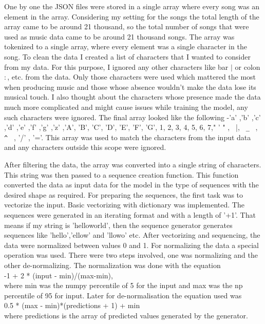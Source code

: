 \documentclass[oneside,12pt]{Classes/RoboticsLaTeX}
\begin{document}
One by one the JSON files were stored in a single array where every song was an element in the array. Considering my setting for the songs the total length of the array came to be around 21 thousand, so the total number of songs that were used as music data came to be around 21 thousand songs. The array was tokenized to a single array, where every element was a single character in the song. To clean the data I created a list of characters that I wanted to consider from my data. For this purpose, I ignored any other characters like bar $|$ or colon $:$, etc. from the data. Only those characters were used which mattered the most when producing music and those whose absence wouldn't make the data lose its musical touch. I also thought about the characters whose presence made the data much more complicated and might cause issues while training the model, any such characters were ignored. The final array looked like the following -'a' ,'b' ,'c' ,'d' ,'e' ,'f' ,'g' ,'z' ,'A', 'B', 'C', 'D', 'E', 'F', 'G', 1, 2, 3, 4, 5, 6, 7," ' " ,\verb| | |, \verb| _ | ,\verb| ^ | , '/' , '='. This array was used to match the characters from the input data and any characters outside this scope were ignored.

After filtering the data, the array was converted into a single string of characters. This string was then passed to a sequence creation function. This function converted the data as input data for the model in the type of sequences with the desired shape as required. For preparing the sequences, the first task was to vectorize the input. Basic vectorizing with dictionary was implemented. The sequences were generated in an iterating format and with a length of  '+1'. That means if my string is 'helloworld', then the sequence generator generates sequences like 'hello','ellow' and 'llowo' etc. After vectorizing and sequencing, the data were normalized between values 0 and 1. For normalizing the data a special operation was used. There were two steps involved, one was normalizing and the other de-normalizing. The normalization was done with the equation \\
-1 + 2 * (input - min)/(max-min), \\
where min was the numpy percentile of 5 for the input and max was the np percentile of 95 for input.
Later for de-normalisation the equation used was \\
0.5 * (max - min)*(predictions + 1) + min\\
where predictions is the array of predicted values generated by the generator.
\end{document}

